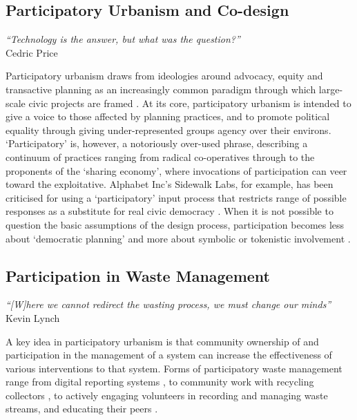 \documentclass[nofonts,nols,justified,nobib]{tufte-book}
\begin{document}
\subsection*{Participatory Urbanism and Co-design}

\begin{flushright}
\emph{``Technology is the answer, but what was the question?''} \cite{price_technology_1979}\\
Cedric Price
\end{flushright}

Participatory urbanism draws from ideologies around advocacy, equity and transactive planning as an increasingly common paradigm through which large-scale civic projects are framed \cite{krivy_participatory_2013}. At its core, participatory urbanism is intended to give a voice to those affected by planning practices, and to promote political equality through giving under-represented groups agency over their environs. `Participatory' is, however, a notoriously over-used phrase, describing a continuum of practices ranging from radical co-operatives through to the proponents of the `sharing economy', where invocations of participation can veer toward the exploitative. Alphabet Inc's Sidewalk Labs, for example, has been criticised for using a `participatory' input process that restricts range of possible responses as a substitute for real civic democracy \cite{mattern_sidewalk_2019}. When it is not possible to question the basic assumptions of the design process, participation becomes less about `democratic planning' and more about symbolic or tokenistic involvement \cite{arnstein_ladder_1969}. %

\subsection*{Participation in Waste Management}
\begin{flushright}
\emph{``[W]here we cannot redirect the wasting process, we must change our minds''}\cite{lynch_wasting_1990} \\
Kevin Lynch
\end{flushright}

A key idea in participatory urbanism is that community ownership of and participation in the management of a system can increase the effectiveness of various interventions to that system. Forms of participatory waste management range from digital reporting systems \cite{offenhuber_waste_2017}, to community work with recycling collectors \cite{tremblay_united_2010, mundano_pimp_nodate}, to actively engaging volunteers in recording and managing waste streams, and educating their peers \cite{offenhuber_waste_2017}. 
\end{document}
